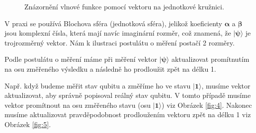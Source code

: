 \begin{figure}[h]

    \centering

    \caption{\label{fig:3}Znázornění vlnové funkce pomocí vektoru na jednotkové kružnici.}
\end{figure}

V praxi se používá Blochova sféra (jednotková sféra), jelikož koeficienty $\bm{\alpha}$ a $\bm{\beta}$ jsou komplexní čísla, která mají navíc imaginární rozměr, což znamená, že $\bm{|\psi\rangle}$ je trojrozměrný vektor. Nám k ilustraci postulátu o měření postačí 2 rozměry.

Podle postulátu o měření máme při měření vektor $\bm{|\psi\rangle}$ aktualizovat promítnutím na osu změřeného výsledku a následně ho prodloužit zpět na délku 1.

Např. když budeme měřit stav qubitu a změříme ho ve stavu $\bm{|1\rangle}$, musíme vektor aktualizovat, aby správně popisoval reálný stav qubitu. V tomto případě musíme vektor promítnout na osu změřeného stavu (osu $\bm{|1\rangle}$) viz Obrázek \ref{fig:4}. Nakonec musíme aktualizovat pravděpodobnost prodloužením vektoru zpět na délku 1 viz Obrázek \ref{fig:5}.

